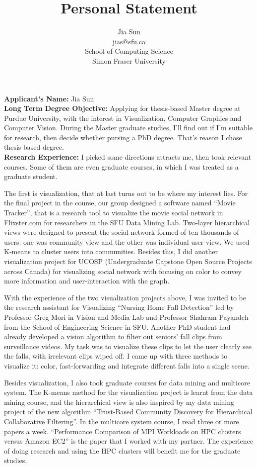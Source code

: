 \documentclass{article}
\title{Personal Statement}
\author{Jia Sun\\jias@sfu.ca\\School of Computing Science\\Simon Fraser University}
\begin{document}
\maketitle%

{\bf Applicant's Name: } Jia Sun\\

{\bf Long Term Degree Objective: } Applying for thesis-based Master degree at Purdue University, with the interest in Visualization, Computer Graphics and Computer Vision. During the Master graduate studies, I'll find out if I'm suitable for research, then decide whether pursing a PhD degree. That's reason I chose thesis-based degree.  \\


{\bf Research Experience: } I picked some directions attracts me, then took relevant courses. Some of them are even graduate courses, in which I was treated as a graduate student. 

The first is visualization, that at last turns out to be where my interest lies. For the final project in the course, our group designed a software named ``Movie Tracker'', that is a research tool to visualize the movie social network in Flixster.com for researchers in the SFU Data Mining Lab. Two-layer hierarchical views were designed to present the social network formed of ten thousands of users: one was community view and the other was individual user view. We used K-means to cluster users into communities. Besides this, I did another visualization project for UCOSP (Undergraduate Capstone Open Source Projects across Canada) for visualizing social network with focusing on color to convey more information and user-interaction with the graph.

With the experience of the two visualization projects above, I was invited to be the research assistant for Visualizing ``Nursing Home Fall Detection'' led by Professor Greg Mori in Vision and Media Lab and Professor Shahram Payandeh from the School of Engineering Science in SFU. Another PhD student had already developed a vision algorithm to filter out seniors' fall clips from surveillance videos. My task was to visualize these clips to let the user clearly see the falls, with irrelevant clips wiped off. I came up with three methods to visualize it: color, fast-forwarding and integrate different falls into a single scene. 

Besides visualization, I also took graduate courses for data mining and multicore system. The K-means method for the visualization project is learnt from the data mining course, and the hierarchical view is also inspired by my data mining project of the new algorithm ``Trust-Based Community Discovery for Hierarchical Collaborative Filtering''. In the multicore system course, I read three or more papers a week. ``Performance Comparison of MPI Workloads on HPC clusters versus Amazon EC2'' is the paper that I worked with my partner. The experience of doing research and using the HPC clusters will benefit me for the graduate studies.  \\
\end{document}
